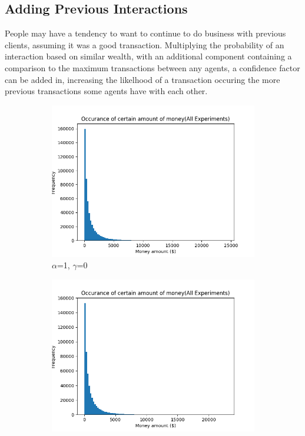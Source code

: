 \documentclass[12pt]{article} %
\begin{document}
\subsection{Adding Previous Interactions}
People may have a tendency to want to continue to do business with previous
clients, assuming it was a good transaction. Multiplying the probability of an
interaction based on similar wealth, with an additional component containing a
comparison to the maximum transactions between any agents, a confidence factor
can be added in, increasing the likelhood of a transaction occuring the more
previous transactions some agents have with each other.

\newcommand{\scaleResultsA}{0.5}
\newcommand{\scaleTextWidth}{0.5}
\begin{figure}[h!]
	\begin{subfigure}{\scaleTextWidth\textwidth}
		\includegraphics[scale=\scaleResultsA]{a1g0.png}
		\caption{$\alpha$=1, $\gamma$=0}
		\label{fig:a1g0}
	\end{subfigure}
	\begin{subfigure}{\scaleTextWidth\textwidth}
		\includegraphics[scale=\scaleResultsA]{a1g1.png}

\end{subfigure}
\end{figure}
\end{document}
